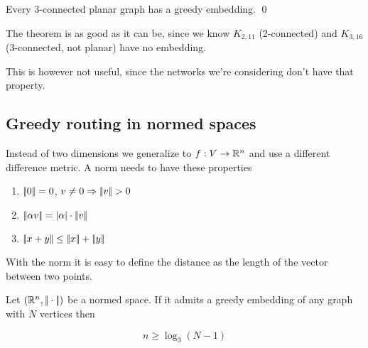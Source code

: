 \begin{thm} Every 3-connected planar graph has a greedy embedding. \qed\end{thm}

The theorem is as good as it can be, since we know $K_{2,11}$ (2-connected) and $K_{3,16}$ (3-connected, not planar) have no embedding.

This is however not useful, since the networks we're considering don't have that property.

\subsection{Greedy routing in normed spaces}

Instead of two dimensions we generalize to $f:V\rightarrow \mathbb{R}^n$ and use a different difference metric. A norm needs to have these properties

\begin{enumerate}
\item $|\!|0|\!| = 0$, $v\neq 0 \Rightarrow |\!|v|\!| >0$
\item $|\!|\alpha v|\!|= |\alpha | \cdot |\!|v|\!|$
\item $|\!|x+y|\!| \leq |\!|x|\!| +|\!|y|\!|$
\end{enumerate}

With the norm it is easy to define the distance as the length of the vector between two points.

\begin{lem} Let $(\mathbb{R}^n, |\!|\cdot|\!|)$ be a normed space. If it admits a greedy embedding of any graph with $N$ vertices then

\[n \geq \log_3(N-1)\]
\end{lem}

